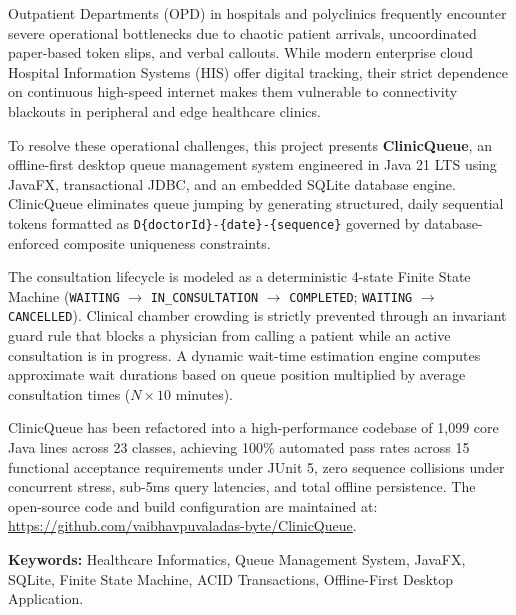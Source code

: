 \documentclass[12pt,a4paper,oneside]{report}
\begin{document}
\noindent
Outpatient Departments (OPD) in hospitals and polyclinics frequently encounter severe operational bottlenecks due to chaotic patient arrivals, uncoordinated paper-based token slips, and verbal callouts. While modern enterprise cloud Hospital Information Systems (HIS) offer digital tracking, their strict dependence on continuous high-speed internet makes them vulnerable to connectivity blackouts in peripheral and edge healthcare clinics.

\vspace{0.25cm}
\noindent
To resolve these operational challenges, this project presents \textbf{ClinicQueue}, an offline-first desktop queue management system engineered in Java 21 LTS using JavaFX, transactional JDBC, and an embedded SQLite database engine. ClinicQueue eliminates queue jumping by generating structured, daily sequential tokens formatted as \texttt{D\{doctorId\}-\{date\}-\{sequence\}} governed by database-enforced composite uniqueness constraints.

\vspace{0.25cm}
\noindent
The consultation lifecycle is modeled as a deterministic 4-state Finite State Machine (\texttt{WAITING} $\rightarrow$ \texttt{IN\_CONSULTATION} $\rightarrow$ \texttt{COMPLETED}; \texttt{WAITING} $\rightarrow$ \texttt{CANCELLED}). Clinical chamber crowding is strictly prevented through an invariant guard rule that blocks a physician from calling a patient while an active consultation is in progress. A dynamic wait-time estimation engine computes approximate wait durations based on queue position multiplied by average consultation times ($N \times 10$ minutes).

\vspace{0.25cm}
\noindent
ClinicQueue has been refactored into a high-performance codebase of 1,099 core Java lines across 23 classes, achieving 100\% automated pass rates across 15 functional acceptance requirements under JUnit 5, zero sequence collisions under concurrent stress, sub-5ms query latencies, and total offline persistence. The open-source code and build configuration are maintained at: \url{https://github.com/vaibhavpuvaladas-byte/ClinicQueue}.

\vspace{0.35cm}
\noindent
\textbf{Keywords:} Healthcare Informatics, Queue Management System, JavaFX, SQLite, Finite State Machine, ACID Transactions, Offline-First Desktop Application.

\newpage
\tableofcontents
\end{document}
